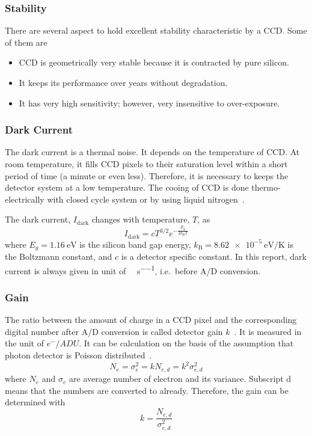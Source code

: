\subsubsection{Stability}
There are several aspect to hold excellent stability characteristic by a CCD. Some of them are
\begin{itemize}
	\item CCD is geometrically very stable because it is contracted by pure silicon.
	\item It keeps its performance over years without degradation.
	\item It has very high sensitivity; however, very insensitive to over-exposure.
\end{itemize}

\subsubsection{Dark Current}
The dark current is a thermal noise. It depends on the temperature of CCD. At room temperature, it fills CCD pixels to their saturation level within a short period of time (a minute or even less). Therefore, it is necessary to keeps the detector system at a low temperature. The cooing of CCD is done thermo-electrically with closed cycle system or by using liquid nitrogen~\cite{manual}.

The dark current, $ {I}_{\text{dark}} $ changes  with temperature, $T$, as
\begin{equation}
{I}_{\text{dark}}=c {T}^{3/2} e^{-{\frac{{E}_{{g}}}{2k_{\text{B}}{T}}}}
\label{Equ:DarkCurrent}
\end{equation}
where $ {E}_{{g}}= \SI{1.16}{\eV} $ is the silicon band gap energy, $ k_{\text{B}}=\SI{8.62e-5 }{\eV\per\kelvin}$ is the Boltzmann constant, and $ c $ is a detector specific constant. In this report, dark current is always given in unit of \si{\ele\per\px\per\s}, i.e.~before A/D conversion.

\subsubsection{Gain}
The ratio between the amount of charge in a CCD pixel and the corresponding digital number after A/D conversion is called detector gain $k$~\cite{manual}. It is measured in the unit of $ e^{-}/\si{ADU} $. It can be calculation on the basis of the assumption that photon detector is Poisson distributed~\cite{manual}.
\begin{equation}
	{N}_{e}= \sigma^2_{e}= k{N}_{e, {d}}= k^2 {\sigma}^2_{e,{d}}
\end{equation}
where ${N}_{e}$ and $ \sigma_{e} $ are average number of electron and its variance. Subscript $\text{d}$ means that the numbers are converted to \si{\ADU} already. Therefore, the gain can be determined with
\begin{equation}
k=\frac{{N}_{e, {d}}}{\sigma^2_{e,{d}}}
\label{math:gain}
\end{equation} 

